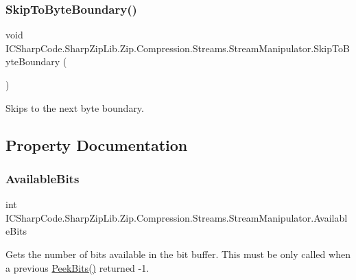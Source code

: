 \subsubsection{\texorpdfstring{Skip\+To\+Byte\+Boundary()}{SkipToByteBoundary()}\hspace{0.1cm}{\footnotesize\ttfamily [2/2]}}
{\footnotesize\ttfamily void I\+C\+Sharp\+Code.\+Sharp\+Zip\+Lib.\+Zip.\+Compression.\+Streams.\+Stream\+Manipulator.\+Skip\+To\+Byte\+Boundary (\begin{DoxyParamCaption}{ }\end{DoxyParamCaption})\hspace{0.3cm}{\ttfamily [inline]}}



Skips to the next byte boundary. 



\subsection{Property Documentation}
\mbox{\label{class_i_c_sharp_code_1_1_sharp_zip_lib_1_1_zip_1_1_compression_1_1_streams_1_1_stream_manipulator_a1ff254ed1ef5997b313db4b06204c6ba}} 
\subsubsection{\texorpdfstring{Available\+Bits}{AvailableBits}}
{\footnotesize\ttfamily int I\+C\+Sharp\+Code.\+Sharp\+Zip\+Lib.\+Zip.\+Compression.\+Streams.\+Stream\+Manipulator.\+Available\+Bits\hspace{0.3cm}{\ttfamily [get]}}



Gets the number of bits available in the bit buffer. This must be only called when a previous \hyperlink{class_i_c_sharp_code_1_1_sharp_zip_lib_1_1_zip_1_1_compression_1_1_streams_1_1_stream_manipulator_acffdc659e2508d7642be37f3c0fa1ec0}{Peek\+Bits()} returned -\/1. 

